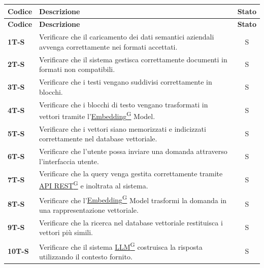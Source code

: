 \documentclass{article}
\begin{document}
\renewcommand{\arraystretch}{1.5}  %

\begin{longtable}{|>{\centering\arraybackslash}m{}|>{\raggedright\arraybackslash}m{}|c|}
    \hline
    \textbf{Codice} & \textbf{Descrizione} & \textbf{Stato} \\
    \hline
    \endfirsthead
    \hline
    \textbf{Codice} & \textbf{Descrizione} & \textbf{Stato} \\
    \hline
    \endhead
    \hline
    \endfoot
    \hline
    \textbf{1T-S} & Verificare che il caricamento dei dati semantici aziendali avvenga correttamente nei formati accettati. & S \\
    \hline
    \textbf{2T-S} & Verificare che il sistema gestisca correttamente documenti in formati non compatibili. & S \\
    \hline
    \textbf{3T-S} & Verificare che i testi vengano suddivisi correttamente in blocchi. & S \\
    \hline
    \textbf{4T-S} & Verificare che i blocchi di testo vengano trasformati in vettori tramite l’\href{https://code7crusaders.github.io/docs/PB/documentazione_interna/glossario.html#embedding}{Embedding\textsuperscript{G}} Model. & S \\
    \hline
    \textbf{5T-S} & Verificare che i vettori siano memorizzati e indicizzati correttamente nel database vettoriale. & S \\
    \hline
    \textbf{6T-S} & Verificare che l’utente possa inviare una domanda attraverso l’interfaccia utente. & S \\
    \hline
    \textbf{7T-S} & Verificare che la query venga gestita correttamente tramite \href{https://code7crusaders.github.io/docs/PB/documentazione_interna/glossario.html#api-rest-representational-state-transfer}{API REST\textsuperscript{G}} e inoltrata al sistema. & S \\
    \hline
    \textbf{8T-S} & Verificare che l’\href{https://code7crusaders.github.io/docs/PB/documentazione_interna/glossario.html#embedding}{Embedding\textsuperscript{G}} Model trasformi la domanda in una rappresentazione vettoriale. & S \\
    \hline
    \textbf{9T-S} & Verificare che la ricerca nel database vettoriale restituisca i vettori più simili. & S \\
    \hline
    \textbf{10T-S} & Verificare che il sistema \href{https://code7crusaders.github.io/docs/PB/documentazione_interna/glossario.html#llm-large-language-model}{LLM\textsuperscript{G}} costruisca la risposta utilizzando il contesto fornito. & S \\

\end{longtable}
\end{document}
